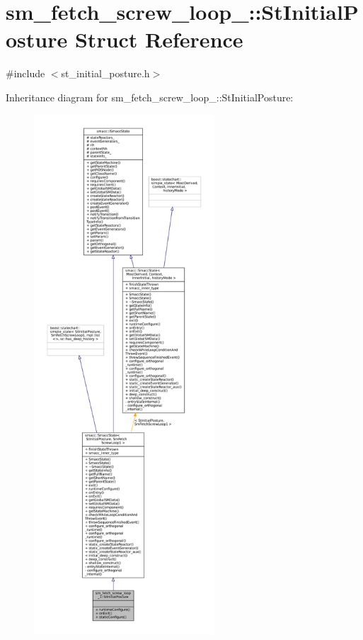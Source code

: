 \hypertarget{structsm__fetch__screw__loop__1_1_1StInitialPosture}{}\section{sm\+\_\+fetch\+\_\+screw\+\_\+loop\+\_\+:\+:St\+Initial\+Posture Struct Reference}
\label{structsm__fetch__screw__loop__1_1_1StInitialPosture}


{\ttfamily \#include $<$st\+\_\+initial\+\_\+posture.\+h$>$}



Inheritance diagram for sm\+\_\+fetch\+\_\+screw\+\_\+loop\+\_\+:\+:St\+Initial\+Posture\+:
\nopagebreak
\begin{figure}[H]
\begin{center}
\leavevmode
\includegraphics[height=550pt]{structsm__fetch__screw__loop__1_1_1StInitialPosture__inherit__graph}
\end{center}
\end{figure}


